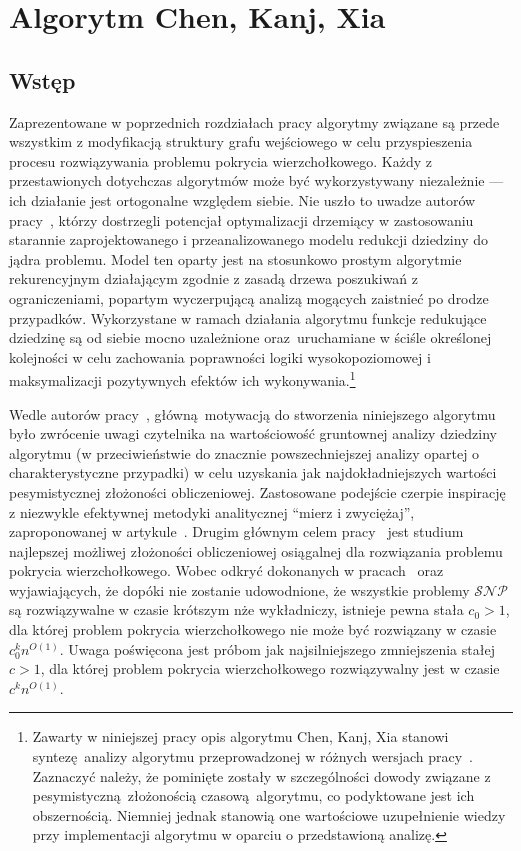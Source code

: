 \section{Algorytm Chen, Kanj, Xia}\label{s_ckx}
\subsection{Wstęp}
\par{
  Zaprezentowane w poprzednich rozdziałach pracy algorytmy związane są przede wszystkim z modyfikacją struktury grafu wejściowego w celu przyspieszenia procesu rozwiązywania problemu pokrycia wierzchołkowego.
  Każdy z przestawionych dotychczas algorytmów może być wykorzystywany niezależnie --- ich działanie jest ortogonalne względem siebie.
  Nie uszło to uwadze autorów pracy~\cite{ImprovedBounds10}, którzy dostrzegli potencjał optymalizacji drzemiący w zastosowaniu starannie zaprojektowanego i przeanalizowanego modelu redukcji dziedziny do jądra problemu.
  Model ten oparty jest na stosunkowo prostym algorytmie rekurencyjnym działającym zgodnie z zasadą drzewa poszukiwań z ograniczeniami, popartym wyczerpującą analizą mogących zaistnieć po drodze przypadków.
  Wykorzystane w ramach działania algorytmu funkcje redukujące dziedzinę są od siebie mocno uzależnione oraz uruchamiane w ściśle określonej kolejności w celu zachowania poprawności logiki wysokopoziomowej i maksymalizacji pozytywnych efektów ich wykonywania.\footnote{Zawarty w niniejszej pracy opis algorytmu Chen, Kanj, Xia stanowi syntezę analizy algorytmu przeprowadzonej w różnych wersjach pracy~\cite{ImprovedBounds10}. Zaznaczyć należy, że pominięte zostały w szczególności dowody związane z pesymistyczną złożonością czasową algorytmu, co podyktowane jest ich obszernością. Niemniej jednak stanowią one wartościowe uzupełnienie wiedzy przy implementacji algorytmu w oparciu o przedstawioną analizę.}
}
\par{
  Wedle autorów pracy~\cite{ImprovedBounds10}, główną motywacją do stworzenia niniejszego algorytmu było zwrócenie uwagi czytelnika na wartościowość gruntownej analizy dziedziny algorytmu (w przeciwieństwie do znacznie powszechniejszej analizy opartej o charakterystyczne przypadki) w celu uzyskania jak najdokładniejszych wartości pesymistycznej złożoności obliczeniowej.
  Zastosowane podejście czerpie inspirację z niezwykle efektywnej metodyki analitycznej ``mierz i zwyciężaj'', zaproponowanej w artykule~\cite{conf/icalp/FominGK05}.
  Drugim głównym celem pracy~\cite{ImprovedBounds10} jest studium najlepszej możliwej złożoności obliczeniowej osiągalnej dla rozwiązania problemu pokrycia wierzchołkowego.
  Wobec odkryć dokonanych w pracach~\cite{Impagliazzo2001512} oraz~\cite{Cai2003789} wyjawiających, że dopóki nie zostanie udowodnione, że wszystkie problemy $\mathcal{SNP}$ są rozwiązywalne w czasie krótszym nże wykładniczy, istnieje pewna stała $c_0 > 1$, dla której problem pokrycia wierzchołkowego nie może być rozwiązany w czasie $c_0^kn^{O(1)}$.
  Uwaga poświęcona jest próbom jak najsilniejszego zmniejszenia stałej $c > 1$, dla której problem pokrycia wierzchołkowego rozwiązywalny jest w czasie $c^kn^{O(1)}$.
}
